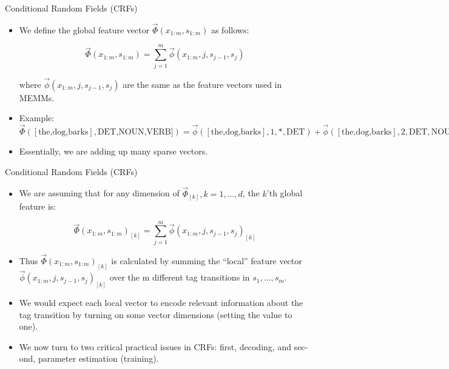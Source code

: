 \documentclass[handout]{beamer}
\begin{document}
\begin{frame}{Conditional Random Fields (CRFs)}
\begin{scriptsize}

\begin{itemize}

\item  We define the global feature vector $\vec{\Phi}(x_{1:m},s_{1:m})$ as follows: 

\begin{displaymath}
 \vec{\Phi}(x_{1:m},s_{1:m}) = \sum_{j=1}^{m} \vec{\phi}(x_{1:m},j,s_{j-1},s_j) 
\end{displaymath}

where $\vec{\phi}(x_{1:m},j,s_{j-1},s_j)$ are the same as the feature vectors used in MEMMs.

\item  Example: \ $ \vec{\Phi}([\text{the,dog,barks}],\text{DET,NOUN,VERB}]) = \vec{\phi}([\text{the,dog,barks}],1,*,\text{DET}) + \vec{\phi}([\text{the,dog,barks}],2,\text{DET},\text{NOUN}) + \vec{\phi}([\text{the,dog,barks}],3,\text{NOUN},\text{VERB})$

\item Essentially, we are adding up many sparse vectors.



\end{itemize}



\end{scriptsize}
\end{frame}

\begin{frame}{Conditional Random Fields (CRFs)}
\begin{scriptsize}

\begin{itemize}
\item We are assuming that for any dimension of $\vec{\Phi}_{[k]}, k= 1, \dots, d$, the $k$'th global feature is:

\begin{displaymath}
 \vec{\Phi}(x_{1:m},s_{1:m})_{[k]} = \sum_{j=1}^{m} \vec{\phi}(x_{1:m},j,s_{j-1},s_j)_{[k]} 
\end{displaymath}

\item Thus $\vec{\Phi}(x_{1:m},s_{1:m})_{[k]}$ is calculated by summing the ``local'' feature vector $\vec{\phi}(x_{1:m},j,s_{j-1},s_j)_{[k]}$  over the m different tag transitions in $s_1,\dots,s_m$.


\item We would expect each local vector to encode relevant information about the tag transition by turning on some vector dimensions (setting the value to one).

\item We now turn to two critical practical issues in CRFs: first, decoding, and sec-
ond, parameter estimation (training).

\end{itemize}

\end{scriptsize}
\end{frame}
\end{document}
